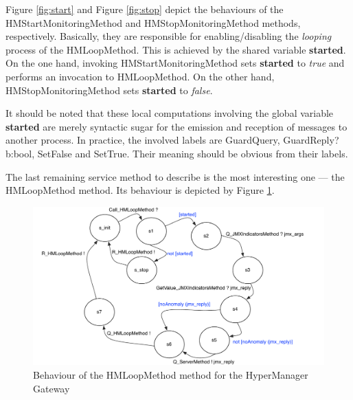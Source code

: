 	Figure \ref{fig:start} and Figure \ref{fig:stop} depict the behaviours of the \textsf{HMStartMonitoringMethod} and 
	\textsf{HMStopMonitoringMethod} methods, respectively. Basically, they are responsible for	
	enabling/disabling the \textit{looping} process of the \textsf{HMLoopMethod}. This is achieved 
	by the shared variable \textbf{started}. On the one hand, invoking \textsf{HMStartMonitoringMethod} sets \textbf{started} 
	to \textit{true} and performs an invocation to \textsf{HMLoopMethod}. On the other hand, 
    \textsf{HMStopMonitoringMethod} sets \textbf{started} to \textit{false}. 

	It should be noted that these local computations involving the global variable \textbf{started} are
	merely syntactic sugar for the emission and reception of messages to another process. In practice, 
	the involved labels  are \textsf{GuardQuery}, \textsf{GuardReply?b:bool}, \textsf{SetFalse} and \textsf{SetTrue}.
	Their meaning should be obvious from their labels.
		
	The last remaining service method	to describe is the most interesting one --- the \textsf{HMLoopMethod} 
	method. Its behaviour is depicted by Figure  \ref{fig:LG}. 
	
\begin{figure}%
	\centering
		\includegraphics[scale=0.5]{figures/chapter3/HMLoopMethodatGateway.pdf}
		\caption{Behaviour of the HMLoopMethod method for the HyperManager Gateway}
		\label{fig:LG}		
\end{figure}	
	
